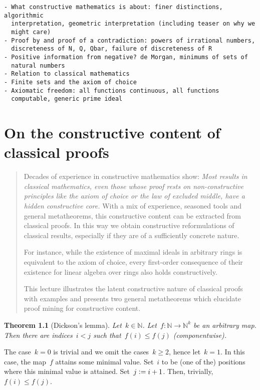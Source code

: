 \documentclass[10pt,reqno,a4paper,openany]{amsbook}
\makeatletter
\theoremstyle{definition}
\theoremstyle{plain}
\newtheorem{thm}[defn]{Theorem}
\theoremstyle{remark}
\newcommand{\NN}{\mathbb{N}}
\newcommand{\?}{\,{:}\,}
\renewcommand{\_}{\mathpunct{.}\,}
\newcommand{\defeq}{\vcentcolon=}
\renewenvironment{proof}[1][\proofname]{\par
  \pushQED{\qed}%
  \normalfont \topsep6\p@\@plus6\p@\relax
  \trivlist
  \item[\hskip\labelsep
        \itshape
    #1\@addpunct{.}]\ignorespaces
}{%
  \popQED\endtrivlist\@endpefalse
}
\newenvironment{intro}{\begin{quote}}{\end{quote}\bigskip}
\makeatother
\begin{document}
\vfill
{\small
\begin{verbatim}
- What constructive mathematics is about: finer distinctions, algorithmic
  interpretation, geometric interpretation (including teaser on why we
  might care)
- Proof by and proof of a contradiction: powers of irrational numbers,
  discreteness of N, Q, Qbar, failure of discreteness of R
- Positive information from negative? de Morgan, minimums of sets of
  natural numbers
- Relation to classical mathematics
- Finite sets and the axiom of choice
- Axiomatic freedom: all functions continuous, all functions
  computable, generic prime ideal
\end{verbatim}
}


\chapter{On the constructive content of classical proofs}

\begin{intro}
Decades of experience in constructive mathematics show: \emph{Most results
in classical mathematics, even those whose proof rests on
non-constructive principles like the axiom of choice or the law of
excluded middle, have a hidden constructive core.} With a mix of
experience, seasoned tools and general metatheorems, this constructive
content can be extracted from classical proofs. In this way we obtain
constructive reformulations of classical results, especially
if they are of a sufficiently concrete nature.

For instance, while the existence of maximal ideals in arbitrary rings
is equivalent to the axiom of choice, every first-order consequence of
their existence for linear algebra over rings also holds constructively.

This lecture illustrates the latent constructive nature of classical
proofs with examples and presents two general metatheorems which
elucidate proof mining for constructive content.
\end{intro}

\begin{thm}[Dickson's lemma]\label{thm:dickson}
Let~$k \in \NN$. Let~$f : \NN \to \NN^k$ be an arbitrary map. Then there are
indices~$i < j$ such that~$f(i) \leq f(j)$ (componentwise).
\end{thm}

\begin{proof}[Proof (classical)]The case~$k = 0$ is trivial and we omit the cases~$k
\geq 2$, hence let~$k = 1$. In this case, the map~$f$ attains some minimal
value. Set~$i$ to be (one of the) positions where this minimal value is
attained. Set~$j \defeq i+1$. Then, trivially, $f(i) \leq f(j)$.
\end{proof}
\end{document}
